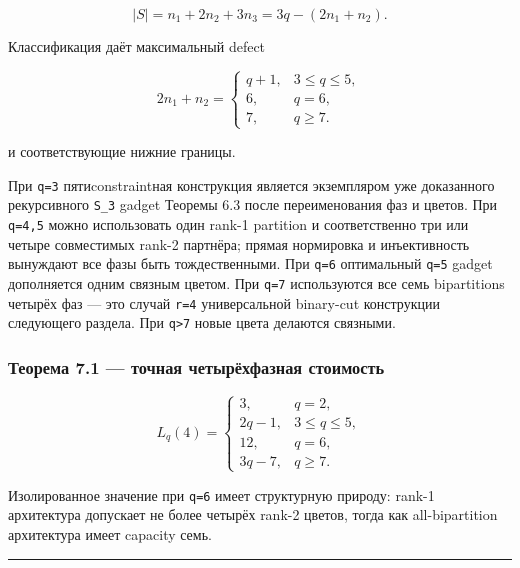 \[
|S|=n_1+2n_2+3n_3=3q-(2n_1+n_2).
\tag{29}
\]

Классификация даёт максимальный defect

\[
2n_1+n_2=\begin{cases}
q+1,&3\le q\le5,\\
6,&q=6,\\
7,&q\ge7.
\end{cases}
\tag{30}
\]

и соответствующие нижние границы.

При \texttt{q=3} пятиconstraintная конструкция является экземпляром уже
доказанного рекурсивного \texttt{S\_3} gadget Теоремы 6.3 после
переименования фаз и цветов. При \texttt{q=4,5} можно использовать один
rank-1 partition и соответственно три или четыре совместимых rank-2
партнёра; прямая нормировка и инъективность вынуждают все фазы быть
тождественными. При \texttt{q=6} оптимальный \texttt{q=5} gadget
дополняется одним связным цветом. При \texttt{q=7} используются все семь
bipartitions четырёх фаз --- это случай \texttt{r=4} универсальной
binary-cut конструкции следующего раздела. При \texttt{q\textgreater{}7}
новые цвета делаются связными.

\hypertarget{ux442ux435ux43eux440ux435ux43cux430-7.1-ux442ux43eux447ux43dux430ux44f-ux447ux435ux442ux44bux440ux451ux445ux444ux430ux437ux43dux430ux44f-ux441ux442ux43eux438ux43cux43eux441ux442ux44c}{%
\subsubsection{Теорема 7.1 --- точная четырёхфазная
стоимость}\label{ux442ux435ux43eux440ux435ux43cux430-7.1-ux442ux43eux447ux43dux430ux44f-ux447ux435ux442ux44bux440ux451ux445ux444ux430ux437ux43dux430ux44f-ux441ux442ux43eux438ux43cux43eux441ux442ux44c}}

\[
\boxed{
L_q(4)=
\begin{cases}
3,&q=2,\\
2q-1,&3\le q\le5,\\
12,&q=6,\\
3q-7,&q\ge7.
\end{cases}
}
\tag{31}
\]

Изолированное значение при \texttt{q=6} имеет структурную природу:
rank-1 архитектура допускает не более четырёх rank-2 цветов, тогда как
all-bipartition архитектура имеет capacity семь.

\begin{center}\rule{0.5\linewidth}{0.5pt}\end{center}

